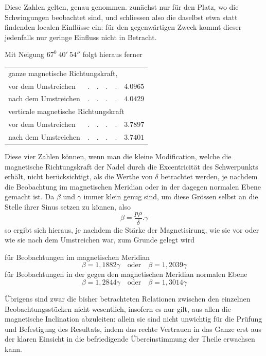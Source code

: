Diese Zahlen gelten, genau genommen. zunächst nur für den Platz, wo die Schwingungen beobachtet sind, und schliessen also die daselbst etwa statt findenden localen Einflüsse ein: für den gegenwärtigen Zweck kommt dieser jedenfalls nur geringe Einfluss nicht in Betracht.

Mit Neigung $67^0\ 40'\ 54''$ folgt hieraus ferner
\begin{center}
\begin{tabular}{llr}
\multicolumn{3}{l}{ganze magnetische Richtungskraft,}\\
\quad vor dem Umstreichen&$.\quad.\quad.\quad.$&$4.0965$\\
\quad nach dem Umstreichen&$.\quad.\quad.\quad.$&$4.0429$\\
\multicolumn{3}{l}{verticale magnetische Richtungskraft}\\
\quad vor dem Umstreichen&$.\quad.\quad.\quad.$&$3.7897$\\
\quad nach dem Umstreichen&$.\quad.\quad.\quad.$&$3.7401$
\end{tabular}
\end{center}

Diese vier Zahlen können, wenn man die kleine Modification, welche die magnetische Richtungskraft der Nadel durch die Excentricität des Schwerpunkts erhält, nicht berücksichtigt, als die Werthe von $\delta$ betrachtet werden, je nachdem die Beobachtung im magnetischen Meridian oder in der dagegen normalen Ebene gemacht ist. Da $\beta$ und $\gamma$ immer klein genug sind, um diese Grössen selbst an die Stelle ihrer Sinus setzen zu können, also
\[
\beta=\frac{p\rho}{\delta}.\gamma
\]
so ergibt sich hieraus, je nachdem die Stärke der Magnetisirung, wie sie vor oder wie sie nach dem Umstreichen war, zum Grunde gelegt wird

für Beobachtungen im magnetischen Meridian
\[
\beta=1{,}1882\gamma\quad\text{oder}\quad\beta=1{,}2039\gamma
\]
für Beobachtungen in der gegen den magnetischen Meridian normalen Ebene
\[
\beta=1{,}2844\gamma\quad\text{oder}\quad\beta=1{,}3014\gamma
\]


Übrigens sind zwar die bisher betrachteten Relationen zwischen den einzelnen Beobachtungsstücken nicht wesentlich, insofern es nur gilt, aus allen die magnetische Inclination abzuleiten: allein sie sind nicht unwichtig für die Prüfung und Befestigung des Resultats, indem das rechte Vertrauen in das Ganze erst aus der klaren Einsicht in die befriedigende Übereinstimmung der Theile erwachsen kann.

